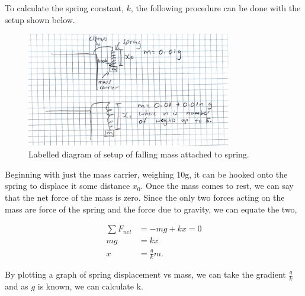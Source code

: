 \documentclass{article}
\begin{document}
To calculate the spring constant, $k$, the following procedure
can be done with the setup shown below.

\begin{figure} [H]
    \centering
    \includegraphics[width=0.8\textwidth]{k calc.png}
    \caption{Labelled diagram of setup of falling mass attached
    to spring.}
    \label{fig:k}
\end{figure}

Beginning with just the mass carrier, weighing 10g, it can be
hooked onto the spring to displace it some distance $x_0$. Once
the mass comes to rest, we can say that the net force of the mass
is zero. Since the only two forces acting on the mass are force of
the spring and the force due to gravity, we can equate the two,

\begin{equation}
    \begin{split}
        \sum F_{net} &= -mg + kx = 0 \\
        mg &= kx \\
        x &= \frac{g}{k}m.
    \end{split}
\end{equation}

By plotting a graph of spring displacement vs mass, we can take
the gradient $\frac{g}{k}$ and as $g$ is known, we can calculate k.
\end{document}

